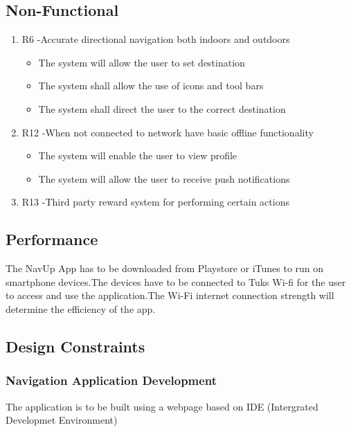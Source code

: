 \documentclass[a4paper, 12pt, one column, aas_macros]{article}
\begin{document}
\subsection{Non-Functional}
\begin{enumerate}

\item R6 -Accurate directional navigation both indoors and outdoors
\begin{itemize}
\item The system will allow the user to set destination
\item The system shall allow the use of icons and tool bars
\item The system shall direct the user to the correct destination
\end{itemize}

\item R12 -When not connected to network have basic offline functionality 

\begin{itemize}
\item The system will enable the user to view profile
\item The system will allow the user to receive push notifications
\end{itemize}

\item R13 -Third party reward system for performing certain actions
\end{enumerate}


\subsection{Performance}

The NavUp App has to be downloaded from Playstore or iTunes to run on smartphone devices.The devices have to be connected to Tuks Wi-fi for the user to access and use the application.The Wi-Fi internet connection strength will determine the efficiency of the app.

\subsection{Design Constraints}

\subsubsection{Navigation Application Development}
The application is to be built using a webpage based on IDE (Intergrated Developmet Environment)
\end{document}

